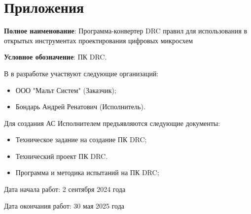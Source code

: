 \chapter*{Приложения}






\textbf{Полное наименование}:
Программа-конвертер DRC правил для использования
в открытых инструментах проектирования цифровых микросхем

\textbf{Условное обозначение}: ПК DRC.


В в разработке участвуют следующие организаций:

\begin{itemize}
	\item ООО "Мальт Систем" (Заказчик);
	\item Бондарь Андрей Ренатович (Исполнитель).
\end{itemize}


Для создания АС Исполнителем предъявляются следующие документы:

\begin{itemize}
	\item Техническое задание на создание ПК DRC;
	\item Технический проект ПК DRC.
	\item Программа и методика испытаний на ПК DRC;
\end{itemize}


Дата начала работ: 2 сентября 2024 года

Дата окончания работ: 30 мая 2025 года



